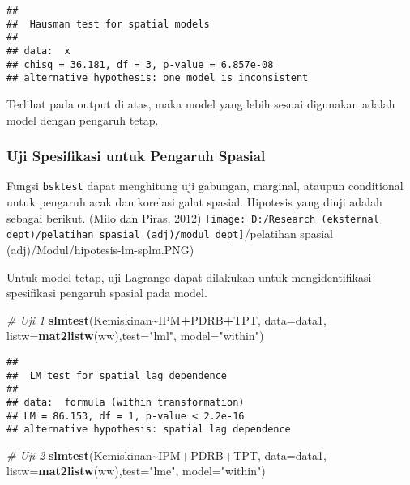 \documentclass[
]{book}
\newenvironment{Shaded}{\begin{snugshade}}{\end{snugshade}}
\newcommand{\CommentTok}[1]{\textcolor[rgb]{0.56,0.35,0.01}{\textit{#1}}}
\newcommand{\DataTypeTok}[1]{\textcolor[rgb]{0.13,0.29,0.53}{#1}}
\newcommand{\KeywordTok}[1]{\textcolor[rgb]{0.13,0.29,0.53}{\textbf{#1}}}
\newcommand{\NormalTok}[1]{#1}
\newcommand{\OperatorTok}[1]{\textcolor[rgb]{0.81,0.36,0.00}{\textbf{#1}}}
\newcommand{\StringTok}[1]{\textcolor[rgb]{0.31,0.60,0.02}{#1}}
\begin{document}
\begin{verbatim}
## 
##  Hausman test for spatial models
## 
## data:  x
## chisq = 36.181, df = 3, p-value = 6.857e-08
## alternative hypothesis: one model is inconsistent
\end{verbatim}

Terlihat pada output di atas, maka model yang lebih sesuai digunakan adalah model dengan pengaruh tetap.

\hypertarget{uji-spesifikasi-untuk-pengaruh-spasial}{%
\subsubsection{Uji Spesifikasi untuk Pengaruh Spasial}\label{uji-spesifikasi-untuk-pengaruh-spasial}}

Fungsi \texttt{bsktest} dapat menghitung uji gabungan, marginal, ataupun conditional untuk pengaruh acak dan korelasi galat spasial. Hipotesis yang diuji adalah sebagai berikut. (Milo dan Piras, 2012)
\texttt{[image: D:/Research (eksternal dept)/pelatihan spasial (adj)/modul dept]}/pelatihan spasial (adj)/Modul/hipotesis-lm-splm.PNG)

Untuk model tetap, uji Lagrange dapat dilakukan untuk mengidentifikasi spesifikasi pengaruh spasial pada model.

\begin{Shaded}
\begin{Highlighting}[]
\CommentTok{\# Uji 1}
\KeywordTok{slmtest}\NormalTok{(Kemiskinan}\OperatorTok{\textasciitilde{}}\NormalTok{IPM}\OperatorTok{+}\NormalTok{PDRB}\OperatorTok{+}\NormalTok{TPT, }\DataTypeTok{data=}\NormalTok{data1, }\DataTypeTok{listw=}\KeywordTok{mat2listw}\NormalTok{(ww),}\DataTypeTok{test=}\StringTok{"lml"}\NormalTok{, }\DataTypeTok{model=}\StringTok{"within"}\NormalTok{)}
\end{Highlighting}
\end{Shaded}

\begin{verbatim}
## 
##  LM test for spatial lag dependence
## 
## data:  formula (within transformation)
## LM = 86.153, df = 1, p-value < 2.2e-16
## alternative hypothesis: spatial lag dependence
\end{verbatim}

\begin{Shaded}
\begin{Highlighting}[]
\CommentTok{\# Uji 2}
\KeywordTok{slmtest}\NormalTok{(Kemiskinan}\OperatorTok{\textasciitilde{}}\NormalTok{IPM}\OperatorTok{+}\NormalTok{PDRB}\OperatorTok{+}\NormalTok{TPT, }\DataTypeTok{data=}\NormalTok{data1, }\DataTypeTok{listw=}\KeywordTok{mat2listw}\NormalTok{(ww),}\DataTypeTok{test=}\StringTok{"lme"}\NormalTok{, }\DataTypeTok{model=}\StringTok{"within"}\NormalTok{)}
\end{Highlighting}
\end{Shaded}
\end{document}
